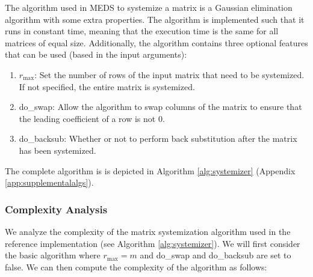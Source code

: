\documentclass[11pt,a4paper]{report}
\theoremstyle{definition}
\begin{document}
The algorithm used in MEDS to systemize a matrix is a Gaussian elimination algorithm with some extra properties. The algorithm is implemented such that it runs in constant time, meaning that the execution time is the same for all matrices of equal size. Additionally, the algorithm contains three optional features that can be used (based in the input arguments):
\begin{enumerate}
  \item $r_{\text{max}}$: Set the number of rows of the input matrix that need to be systemized. If not specified, the entire matrix is systemized.
  \item do\_swap: Allow the algorithm to swap columns of the matrix to ensure that the leading coefficient of a row is not 0.
  \item do\_backsub: Whether or not to perform back substitution after the matrix has been systemized.
\end{enumerate}
The complete algorithm is is depicted in Algorithm \ref{alg:systemizer} (Appendix \ref{app:supplementalalgs}).

\subsubsection{Complexity Analysis}
\label{sec:matrixsystemizationcomplexity}
We analyze the complexity of the matrix systemization algorithm used in the reference implementation (see Algorithm \ref{alg:systemizer}). We will first consider the basic algorithm where $r_\text{max} = m$ and do\_swap and do\_backsub are set to false. We can then compute the complexity of the algorithm as follows:
\end{document}

